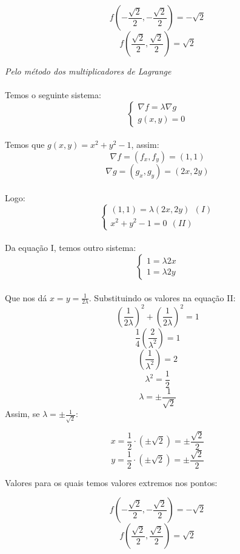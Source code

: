 \documentclass[11pt]{article}
\begin{document}
$$f\left( - \frac{\sqrt{2}}{2}, - \frac{\sqrt{2}}{2} \right) = - \sqrt{2}$$
$$f\left( \frac{\sqrt{2}}{2}, \frac{\sqrt{2}}{2} \right) = \sqrt{2}$$

\textit{Pelo método dos multiplicadores de Lagrange}\\
\\
Temos o seguinte sistema:\\
\[
	\begin{cases}
		\nabla f = \lambda \nabla g\\
		g(x, y) = 0
	\end{cases}
\]
\\
Temos que $g(x, y) = x^2 + y^2 - 1$, assim:
$$\nabla f = (f_x, f_y) = (1, 1)$$
$$\nabla g = (g_x, g_y) = (2x, 2y)$$\\
Logo:
\[
	\begin{cases}
		(1, 1) = \lambda (2x, 2y) \ \ (I)\\
		x^2 + y^2 - 1 = 0 \ \ (II)
	\end{cases}
\]
\\
Da equação I, temos outro sistema:\\
\[
	\begin{cases}
		1 = \lambda 2x \\
		1 = \lambda 2y
	\end{cases}
\]\\
Que nos dá $x = y = \frac{1}{2\lambda}$. Substituindo os valores na equação II:\\
$$\left( \frac{1}{2\lambda} \right)^2 + \left( \frac{1}{2\lambda} \right)^2 = 1$$
$$ \frac{1}{4} \left( \frac{2}{\lambda^2} \right) = 1$$
$$ \left( \frac{1}{\lambda^2} \right) = 2$$
$$\lambda^2 = \frac{1}{2}$$
$$\lambda = \pm \frac{1}{\sqrt{2}}$$
Assim, se $\lambda = \pm \frac{1}{\sqrt{2}}$:

$$x = \frac{1}{2} \cdot (\pm \sqrt{2}) = \pm \frac{\sqrt{2}}{2}$$
$$y = \frac{1}{2} \cdot (\pm \sqrt{2}) = \pm \frac{\sqrt{2}}{2}$$

Valores para os quais temos valores extremos nos pontos:

$$f\left( - \frac{\sqrt{2}}{2}, - \frac{\sqrt{2}}{2} \right) = - \sqrt{2}$$
$$f\left( \frac{\sqrt{2}}{2}, \frac{\sqrt{2}}{2} \right) = \sqrt{2}$$
\end{document}
